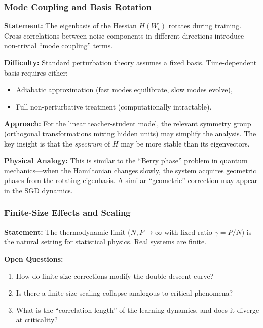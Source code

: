 \documentclass[
  journal=largetwo,
  simfonts=false,
  year=2025,
  volume=37,
]{cup-journal}
\begin{document}
\subsubsection{Mode Coupling and Basis Rotation}

\textbf{Statement:} The eigenbasis of the Hessian $H(W_t)$ rotates during training. Cross-correlations between noise components in different directions introduce non-trivial ``mode coupling'' terms.

\textbf{Difficulty:} Standard perturbation theory assumes a fixed basis. Time-dependent basis requires either:
\begin{itemize}
    \item Adiabatic approximation (fast modes equilibrate, slow modes evolve),
    \item Full non-perturbative treatment (computationally intractable).
\end{itemize}

\textbf{Approach:} For the linear teacher-student model, the relevant symmetry group (orthogonal transformations mixing hidden units) may simplify the analysis. The key insight is that the \textit{spectrum} of $H$ may be more stable than its eigenvectors.

\textbf{Physical Analogy:} This is similar to the ``Berry phase'' problem in quantum mechanics---when the Hamiltonian changes slowly, the system acquires geometric phases from the rotating eigenbasis. A similar ``geometric'' correction may appear in the SGD dynamics.

\subsubsection{Finite-Size Effects and Scaling}

\textbf{Statement:} The thermodynamic limit ($N, P \to \infty$ with fixed ratio $\gamma = P/N$) is the natural setting for statistical physics. Real systems are finite.

\textbf{Open Questions:}
\begin{enumerate}
    \item How do finite-size corrections modify the double descent curve?
    \item Is there a finite-size scaling collapse analogous to critical phenomena?
    \item What is the ``correlation length'' of the learning dynamics, and does it diverge at criticality?
\end{enumerate}
\end{document}
